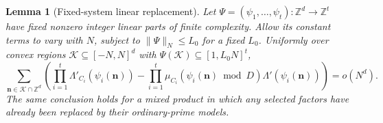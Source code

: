 \documentclass[11pt]{article}
\newtheorem{lemma}[theorem]{Lemma}
\theoremstyle{definition}
\theoremstyle{remark}
\newcommand{\Z}{\mathbb Z}
\begin{document}
\begin{lemma}[Fixed-system linear replacement]
\label{lem:gaussian-linear-replacement}
Let $\Psi=(\psi_1,\ldots,\psi_t):\Z^d\to\Z^t$ have fixed nonzero integer
linear parts of finite complexity. Allow its constant terms to vary
with $N$, subject to $\|\Psi\|_N\leq L_0$ for a fixed $L_0$.
Uniformly over convex regions $\mathcal K\subseteq[-N,N]^d$ with
$\Psi(\mathcal K)\subseteq[1,L_0N]^t$,
\begin{equation}\label{eq:gaussian-linear-replacement}
 \sum_{\mathbf n\in\mathcal K\cap\Z^d}
 \left(\prod_{i=1}^t\Lambda'_{C_i}(\psi_i(\mathbf n))
 -\prod_{i=1}^t\mu_{C_i}(\psi_i(\mathbf n)\bmod D)
                         \Lambda'(\psi_i(\mathbf n))\right)=o(N^d).
\end{equation}
The same conclusion holds for a mixed product in which any selected
factors have already been replaced by their ordinary-prime models.
\end{lemma}
\end{document}
